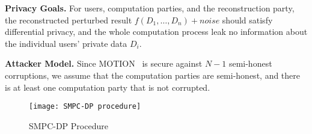 \textbf{Privacy Goals.}
For users, computation parties, and the reconstruction party, the reconstructed perturbed result $f\left(D_1,\ldots, D_n\right) +noise$ should satisfy differential privacy, and the whole computation process leak no information about the individual users' private data $D_i$.

\textbf{Attacker Model.}
Since MOTION~\cite{braun2022motion} is secure against $N-1$ semi-honest corruptions, we assume that the computation parties are semi-honest, and there is at least one computation party that is not corrupted.

\begin{figure}[htbp]
      \texttt{[image: SMPC-DP procedure]}
      \centering
      \caption{SMPC-DP Procedure}
      \label{img:MPCDPProcedure}
\end{figure}
\FloatBarrier






